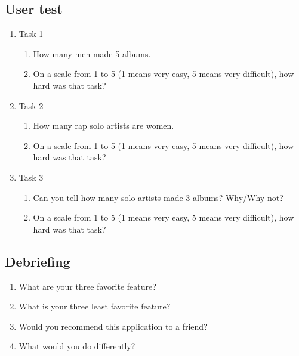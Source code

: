 \documentclass{article}
\begin{document}
\subsection{User test}
\begin{enumerate}
    \item Task 1
          \begin{enumerate}
              \item How many men made 5 albums.
              \item On a scale from 1 to 5 (1 means very easy, 5 means very difficult), how hard was that task?
          \end{enumerate}
    \item Task 2
          \begin{enumerate}
              \item How many rap solo artists are women.
              \item On a scale from 1 to 5 (1 means very easy, 5 means very difficult), how hard was that task?
          \end{enumerate}
    \item Task 3
          \begin{enumerate}
              \item Can you tell how many solo artists made 3 albums? Why/Why not?
              \item On a scale from 1 to 5 (1 means very easy, 5 means very difficult), how hard was that task?
          \end{enumerate}
\end{enumerate}

\subsection{Debriefing}
\begin{enumerate}
    \item What are your three favorite feature?
    \item What is your three least favorite feature?
    \item Would you recommend this application to a friend?
    \item What would you do differently?
\end{enumerate}
\end{document}
